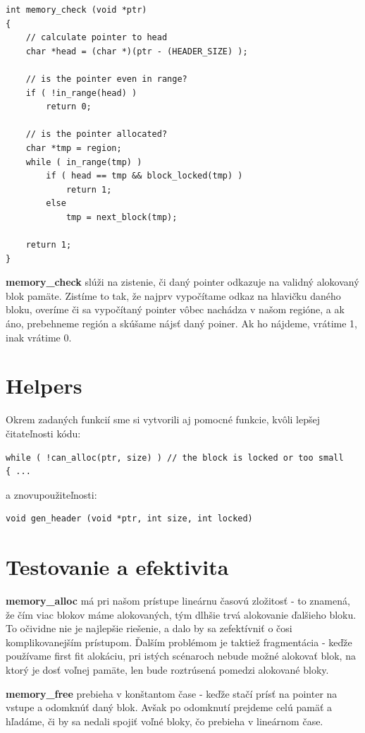 \documentclass[a4paper,11pt]{article}
\theoremstyle{mytheor}
\begin{document}
\newpage

\begin{lstlisting}
int memory_check (void *ptr)
{
	// calculate pointer to head
	char *head = (char *)(ptr - (HEADER_SIZE) );

	// is the pointer even in range?
	if ( !in_range(head) )
		return 0;

	// is the pointer allocated?
	char *tmp = region;
	while ( in_range(tmp) )
		if ( head == tmp && block_locked(tmp) )
			return 1;
		else
			tmp = next_block(tmp);

	return 1;
}
\end{lstlisting}

\textbf{memory\_check} slúži na zistenie, či daný pointer odkazuje na validný alokovaný blok pamäte. Zistíme to tak, že najprv vypočítame odkaz na hlavičku daného bloku, overíme či sa vypočítaný pointer vôbec nachádza v našom regióne, a ak áno, prebehneme región a skúšame nájsť daný poiner. Ak ho nájdeme, vrátime 1, inak vrátime 0.

\section*{Helpers}

Okrem zadaných funkcií sme si vytvorili aj pomocné funkcie, kvôli lepšej čitateľnosti kódu:
\begin{lstlisting}
while ( !can_alloc(ptr, size) ) // the block is locked or too small
{ ... 
\end{lstlisting}

a znovupoužiteľnosti:
\begin{lstlisting}
void gen_header (void *ptr, int size, int locked)
\end{lstlisting}

\section*{Testovanie a efektivita}

\textbf{memory\_alloc} má pri našom prístupe lineárnu časovú zložitosť - to znamená, že čím viac blokov máme alokovaných, tým dlhšie trvá alokovanie ďalšieho bloku. To očividne nie je najlepšie riešenie, a dalo by sa zefektívniť o čosi komplikovanejším prístupom. Ďalším problémom je taktiež fragmentácia - keďže používame first fit alokáciu, pri istých scénaroch nebude možné alokovať blok, na ktorý je dosť voľnej pamäte, len bude roztrúsená pomedzi alokované bloky.

\textbf{memory\_free} prebieha v konštantom čase - keďže stačí prísť na pointer na vstupe a odomknúť daný blok. Avšak po odomknutí prejdeme celú pamäť a hľadáme, či by sa nedali spojiť voľné bloky, čo prebieha v lineárnom čase.
\end{document}
